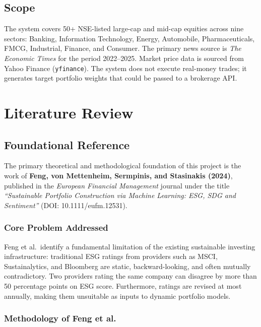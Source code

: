 \documentclass[12pt, a4paper]{article}
\begin{document}
\subsection{Scope}

The system covers 50+ NSE-listed large-cap and mid-cap equities across nine sectors: Banking, Information Technology, Energy, Automobile, Pharmaceuticals, FMCG, Industrial, Finance, and Consumer. The primary news source is \textit{The Economic Times} for the period 2022--2025. Market price data is sourced from Yahoo Finance (\texttt{yfinance}). The system does not execute real-money trades; it generates target portfolio weights that could be passed to a brokerage API.

\section{Literature Review}

\subsection{Foundational Reference}

The primary theoretical and methodological foundation of this project is the work of \textbf{Feng, von Mettenheim, Sermpinis, and Stasinakis (2024)}, published in the \textit{European Financial Management} journal under the title \textit{``Sustainable Portfolio Construction via Machine Learning: ESG, SDG and Sentiment''} (DOI: 10.1111/eufm.12531).

\subsubsection*{Core Problem Addressed}

Feng et al.\ identify a fundamental limitation of the existing sustainable investing infrastructure: traditional ESG ratings from providers such as MSCI, Sustainalytics, and Bloomberg are static, backward-looking, and often mutually contradictory. Two providers rating the same company can disagree by more than 50 percentage points on ESG score. Furthermore, ratings are revised at most annually, making them unsuitable as inputs to dynamic portfolio models.

\subsubsection*{Methodology of Feng et al.}
\end{document}
